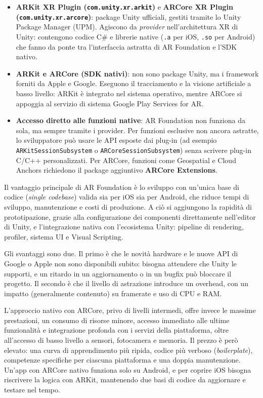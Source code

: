 \begin{itemize}
    \item \textbf{ARKit XR Plugin (\texttt{com.unity.xr.arkit})} e \textbf{ARCore XR Plugin (\texttt{com.unity.xr.arcore})}: package Unity ufficiali, gestiti tramite lo Unity Package Manager (UPM). Agiscono da \textit{provider} nell'architettura XR di Unity: contengono codice C\# e librerie native (\texttt{.a} per iOS, \texttt{.so} per Android) che fanno da ponte tra l'interfaccia astratta di AR Foundation e l'SDK nativo.

    \item \textbf{ARKit e ARCore (SDK nativi)}: non sono package Unity, ma i framework forniti da Apple e Google. Eseguono il tracciamento e la visione artificiale a basso livello: ARKit è integrato nel sistema operativo, mentre ARCore si appoggia al servizio di sistema Google Play Services for AR.

    \item \textbf{Accesso diretto alle funzioni native}: AR Foundation non funziona da sola, ma sempre tramite i provider. Per funzioni esclusive non ancora astratte, lo sviluppatore può usare le API esposte dai plug-in (ad esempio \texttt{ARKitSessionSubsystem} o \texttt{ARCoreSessionSubsystem}) senza scrivere plug-in C/C++ personalizzati. Per ARCore, funzioni come Geospatial e Cloud Anchors richiedono il package aggiuntivo \textbf{ARCore Extensions}.
\end{itemize}

Il vantaggio principale di AR Foundation è lo sviluppo con un'unica base di codice (\textit{single codebase}) valida sia per iOS sia per Android, che riduce tempi di sviluppo, manutenzione e costi di produzione. A ciò si aggiungono la rapidità di prototipazione, grazie alla configurazione dei componenti direttamente nell'editor di Unity, e l'integrazione nativa con l'ecosistema Unity: pipeline di rendering, profiler, sistema UI e Visual Scripting.

Gli svantaggi sono due. Il primo è che le novità hardware e le nuove API di Google o Apple non sono disponibili subito: bisogna attendere che Unity le supporti, e un ritardo in un aggiornamento o in un bugfix può bloccare il progetto. Il secondo è che il livello di astrazione introduce un overhead, con un impatto (generalmente contenuto) su framerate e uso di CPU e RAM.

L'approccio nativo con ARCore, privo di livelli intermedi, offre invece le massime prestazioni, un consumo di risorse minore, accesso immediato alle ultime funzionalità e integrazione profonda con i servizi della piattaforma, oltre all'accesso di basso livello a sensori, fotocamera e memoria. Il prezzo è però elevato: una curva di apprendimento più ripida, codice più verboso (\textit{boilerplate}), competenze specifiche per ciascuna piattaforma e una doppia manutenzione. Un'app con ARCore nativo funziona solo su Android, e per coprire iOS bisogna riscrivere la logica con ARKit, mantenendo due basi di codice da aggiornare e testare nel tempo.